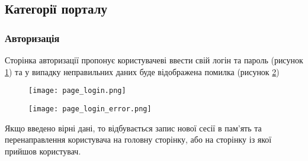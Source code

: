\subsection{Категорії порталу}
\subsubsection{Авторизація}
\par Сторінка авторизації пропонує користувачеві ввести свій логін та пароль (рисунок \ref{pic:page_login}) та у випадку неправильних даних буде відображена помилка (рисунок \ref{pic:page_login_error})

\begin{figure}[!ht]
\centering
    \texttt{[image: page\_login.png]}
    \label{pic:page_login}
\end{figure}

\begin{figure}[!ht]
\centering
    \texttt{[image: page\_login\_error.png]}
    \label{pic:page_login_error}
\end{figure}

\par Якщо введено вірні дані, то відбувається запис нової сесії в пам'ять та перенаправлення користувача на головну сторінку, або на сторінку із якої прийшов користувач.

